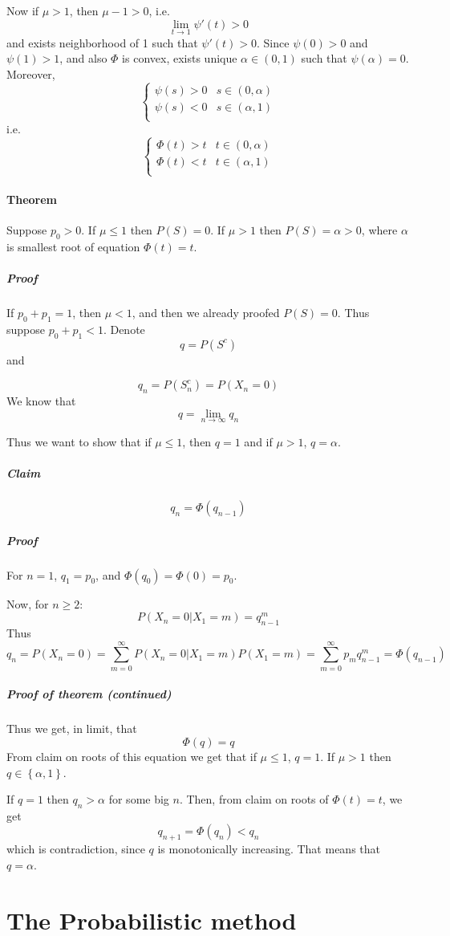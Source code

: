 Now if $\mu > 1$, then $\mu-1>0$, i.e.
$$\lim_{t \to 1} \psi'(t) > 0$$
and exists neighborhood of 1 such that $\psi'(t) > 0$. Since $\psi(0)>0$ and $\psi(1) > 1$, and also $\Phi$ is convex, exists unique $\alpha \in (0,1)$ such that $\psi(\alpha)=0$. Moreover, 
$$\begin{cases}
\psi(s)>0 & s\in (0, \alpha) \\
\psi(s)<0 & s\in (\alpha,1) \\
\end{cases}$$
i.e.
$$\begin{cases}
\Phi(t)>t & t\in (0, \alpha) \\
\Phi(t)<t & t\in (\alpha,1) \\
\end{cases}$$
\paragraph{Theorem}
Suppose $p_0>0$. If $\mu \leq 1$ then $P(S)=0$. If $\mu> 1$ then $P(S) = \alpha > 0$, where $\alpha$ is smallest root of equation $\Phi(t)=t$.
\subparagraph{Proof}
If $p_0+p_1= 1$, then $\mu < 1$, and then we already proofed $P(S)=0$. Thus suppose $p_0+p_1 < 1$. Denote 
$$q = P\left(S^c\right)$$
and

$$q_n = P\left(S^c_n\right) = P(X_n=0)$$
We know that
$$q = \lim_{n\to \infty} q_n$$

Thus we want to show that if $\mu \leq 1$, then $q=1$ and if $\mu > 1$, $q=\alpha$.


\subparagraph{Claim}
$$q_n = \Phi\left(q_{n-1}\right)$$
\subparagraph{Proof}
For $n=1$, $q_1 = p_0$, and $\Phi(q_0) = \Phi(0) = p_0$.

Now, for $n\geq 2$:
$$P(X_n = 0 | X_1 = m) = q_{n-1}^m$$
Thus
$$q_n  = P(X_n= 0) = \sum_{m=0}^\infty P(X_n = 0 | X_1 = m) P(X_1 = m) = \sum_{m=0}^\infty p_m q_{n-1}^m = \Phi(q_{n-1})$$

\subparagraph{Proof of theorem (continued)}
Thus we get, in limit, that
$$\Phi(q) = q$$
From claim on roots of this equation we get that if $\mu \leq 1$, $q=1$. If $\mu > 1$ then $q \in \left\{ \alpha, 1 \right\}$. 

If $q=1$ then $q_n > \alpha $ for some big $n$. Then, from claim on roots of $\Phi(t)=t$, we get
 $$q_{n+1} = \Phi(q_n) < q_n$$
 which is contradiction, since $q$ is monotonically increasing. That means that $q=\alpha$.
 
 \section{The Probabilistic method}

